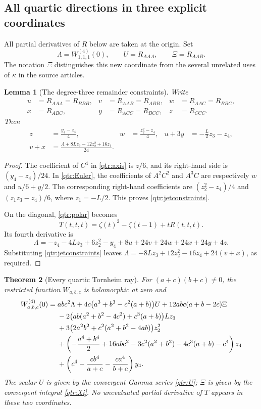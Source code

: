 \documentclass[11pt,a4paper]{article}
\numberwithin{equation}{section}
\newtheorem{theorem}{Theorem}[section]
\newtheorem{lemma}[theorem]{Lemma}
\theoremstyle{definition}
\theoremstyle{remark}
\begin{document}
\subsection{All quartic directions in three explicit coordinates}

All partial derivatives of \(R\) below are taken at the origin.
Set
\[
 \Lambda=W_{1,1,1}^{(4)}(0),\qquad
 U=R_{AAA},\qquad \Xi=R_{AAB}.
\]
The notation \(\Xi\) distinguishes this new coordinate from the
several unrelated uses of \(\kappa\) in the source articles.

\begin{lemma}[The degree-three remainder constraints]
\label{qtr:constraints}
Write
\begin{align*}
 u&=R_{AAA}=R_{BBB},& v&=R_{AAB}=R_{ABB},&
 w&=R_{AAC}=R_{BBC},\\
 x&=R_{ABC},& y&=R_{ACC}=R_{BCC},& z&=R_{CCC}.
\end{align*}
Then
\begin{align}
 z&=\frac{y_4-z_4}{4},&
 w&=\frac{z_2^2-z_4}{4},&
 u+3y&=-\frac L2z_3-z_4,\label{qtr:jetconstraints}\\
 v+x&=\frac{\Lambda+8Lz_3-12z_2^2+16z_4}{24}.
 \label{qtr:diagonalconstraint}
\end{align}
\end{lemma}

\begin{proof}
The coefficient of \(C^4\) in \eqref{qtr:axis} is \(z/6\),
and its right-hand side is \((y_4-z_4)/24\). In
\eqref{qtr:Euler}, the coefficients of \(A^2C^2\) and
\(A^3C\) are respectively \(w\) and \(u/6+y/2\).
The corresponding right-hand coefficients are
\((z_2^2-z_4)/4\) and
\((z_1z_3-z_4)/6\), where \(z_1=-L/2\).
This proves \eqref{qtr:jetconstraints}.

On the diagonal, \eqref{qtr:polar} becomes
\[
 T(t,t,t)=\zeta(t)^2-\zeta(t-1)+tR(t,t,t).
\]
Its fourth derivative is
\[
 \Lambda=-z_4-4Lz_3+6z_2^2-y_4
             +8u+24v+24w+24x+24y+4z.
\]
Substituting \eqref{qtr:jetconstraints} leaves
\(\Lambda=-8Lz_3+12z_2^2-16z_4+24(v+x)\),
as required.
\end{proof}

\begin{theorem}[Every quartic Tornheim ray]\label{qtr:quartic}
For \((a+c)(b+c)\ne0\), the restricted function \(W_{a,b,c}\)
is holomorphic at zero and
\begin{align}
 W_{a,b,c}^{(4)}(0)={}&
 abc^2\Lambda
 +4c\bigl(a^3+b^3-c^2(a+b)\bigr)U
 +12abc(a+b-2c)\Xi\notag\\
 &-2\bigl(ab(a^2+b^2-4c^2)+c^3(a+b)\bigr)Lz_3\notag\\
 &+3\bigl(2a^2b^2+c^2(a^2+b^2-4ab)\bigr)z_2^2\notag\\
 &+\left(-\frac{a^4+b^4}{2}+16abc^2
        -3c^2(a^2+b^2)-4c^3(a+b)-c^4\right)z_4\notag\\
 &+\left(c^4-\frac{cb^4}{a+c}-\frac{ca^4}{b+c}\right)y_4.
 \label{qtr:quarticformula}
\end{align}
The scalar \(U\) is given by the convergent Gamma series
\eqref{qtr:U}; \(\Xi\) is given by the convergent integral
\eqref{qtr:Xi}. No unevaluated partial derivative of \(T\)
appears in these two coordinates.
\end{theorem}
\end{document}
